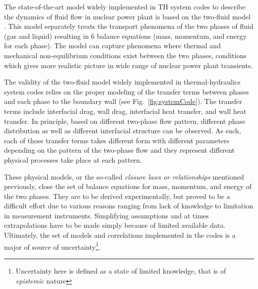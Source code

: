 \documentclass[11pt,titlepage]{article}
\begin{document}

The state-of-the-art model widely implemented in TH system codes to describe the dynamics of fluid flow in nuclear power plant is based on the two-fluid model \cite{Ishii2011}.
This model separately treats the transport phenomena of the two phases of fluid (gas and liquid) resulting in 6 balance equations (mass, momentum, and energy for each phase).
The model can capture phenomena where thermal and mechanical non-equilibrium conditions exist between the two phases, conditions which gives more realistic picture in wide range of nuclear power plant transients.

The validity of the two-fluid model widely implemented in thermal-hydraulics system codes relies on the proper modeling of the transfer terms between phases and each phase to the boundary wall (see Fig.~\ref{fig:systemCode}).
The transfer terms include interfacial drag, wall drag, interfacial heat transfer, and wall heat transfer.
In principle, based on different two-phase flow pattern, different phase distribution as well as different interfacial structure can be observed.
As such, each of those transfer terms takes different form with different parameters depending on the pattern of the two-phase flow and they represent different physical processes take place at each pattern.
 
These physical models, or the so-called \emph{closure laws or relationships} mentioned previously, close the set of balance equations for mass, momentum, and energy of the two phases.
They are to be derived experimentally, but proved to be a difficult effort \cite{Nelson1992,Wulff2007} due to various reasons ranging from lack of knowledge to limitation in measurement instruments. 
Simplifying assumptions and at times extrapolations have to be made simply because of limited available data. 
Ultimately, the set of models and correlations implemented in the codes is a major of source of uncertainty\footnote{Uncertainty here is defined as a state of limited knowledge, that is of \emph{epistemic} nature}.
\end{document}
